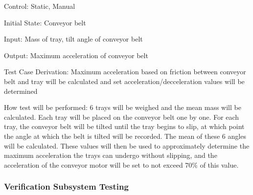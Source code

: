 \documentclass[12pt, titlepage]{article}
\begin{document}
\begin{enumerate}
Control: Static, Manual

Initial State: Conveyor belt

Input: Mass of tray, tilt angle of conveyor belt

Output: Maximum acceleration of conveyor belt

Test Case Derivation: Maximum acceleration based on friction between conveyor belt and tray will be calculated 
and set acceleration/decceleration values will be determined

How test will be performed: 6 trays will be weighed and the mean mass will be calculated. Each tray will be placed on 
the conveyor belt one by one. For each tray, the conveyor belt will be tilted until the tray begins to slip, at which
point the angle at which the belt is tilted will be recorded. The mean of these 6 angles will be calculated. These values
will then be used to approximately determine the maximum acceleration the trays can undergo without slipping, and the
acceleration of the conveyor motor will be set to not exceed 70\% of this value.
\\
\end{enumerate}

\subsubsection{Verification Subsystem Testing}
\end{document}
